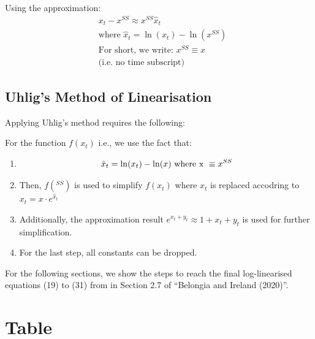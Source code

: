 \documentclass[11pt,preprint, authoryear]{elsarticle}
\numberwithin{equation}{section}
\numberwithin{figure}{section}
\numberwithin{table}{section}
\begin{document}
Using the approximation: \[\begin{aligned}
&x_t - x^{SS} \approx x^{SS} \hat{x}_{t}
\\
&\text{where } \hat{x}_{t} = \ln(x_t)-\ln(x^{SS})
\\
&\text{For short, we write: } x^{SS} \equiv x
\\
&\text{(i.e. no time subscript)}
\end{aligned}\]

\hypertarget{uhligs-method-of-linearisation}{%
\subsection{Uhlig's Method of
Linearisation}\label{uhligs-method-of-linearisation}}

Applying Uhlig's method requires the following:

\newpage

For the function \(f(x_t)\) i.e., we use the fact that:

\begin{enumerate}
\def\labelenumi{\arabic{enumi}.}
\item
  \[\hat{x}_t = \ln(x_t) - \ln(x) \\
  \text{ where x } \equiv x^{SS}\]
\item
  Then, \(f(^{SS})\) is used to simplify \(f(x_t)\) where \(x_t\) is
  replaced accodring to \(x_t = x \cdot e^{\hat{x}_t}\)
\item
  Additionally, the approximation result
  \(e^{x_t+y_t} \approx 1+x_t+y_t\) is used for further simplification.
\item
  For the last step, all constants can be dropped.
\end{enumerate}

For the following sections, we show the steps to reach the final
log-linearised equations (19) to (31) from in Section 2.7 of ``Belongia
and Ireland (2020)''.

\newpage

\hypertarget{table}{%
\section{Table}\label{table}}
\end{document}
